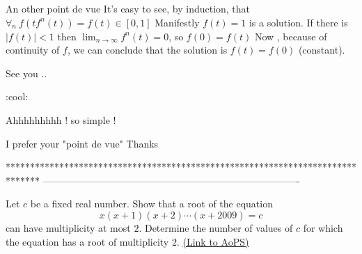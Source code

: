 \begin{solution}
	\begin{tcolorbox}An other  point de vue   
It's easy to see, by induction,  that $\forall_n \ f(tf^n(t))=f(t)\in [0,1]$
Manifestly $f(t)=1$ is a solution. 
If  there is $| f(t)|<1$  then $\lim_{n\rightarrow \infty}f^n(t)=0$, so $f(0)=f(t)$
Now , because of continuity of $f$, we can conclude that  the solution is $f(t)=f(0)$ (constant). 

See you ..

 :cool:\end{tcolorbox}
Ahhhhhhhhh ! so simple !

I prefer your "point de vue" 
Thanks
\end{solution}
*******************************************************************************
-------------------------------------------------------------------------------

\begin{problem}
	Let $c$ be a fixed real number. Show that a root of the equation
\[x(x+1)(x+2)\cdots(x+2009)=c\]
can have multiplicity at most $2$. Determine the number of values of $c$ for which the equation has a root of multiplicity $2$.
	\flushright \href{https://artofproblemsolving.com/community/c6h474010}{(Link to AoPS)}
\end{problem}



